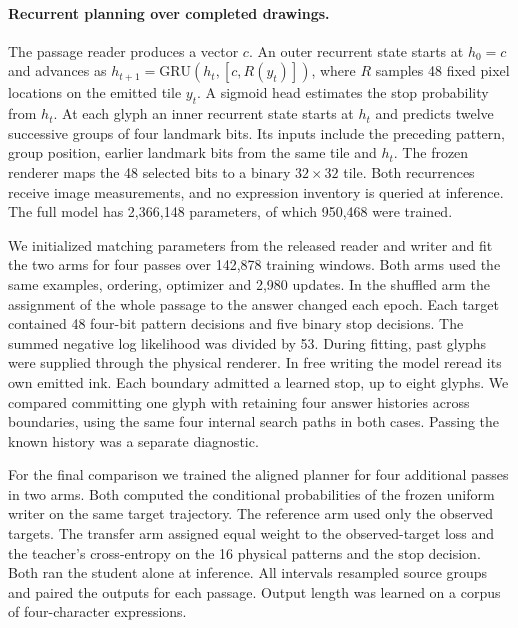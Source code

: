 \paragraph{Recurrent planning over completed drawings.}
The passage reader produces a vector $c$. An outer recurrent state starts at $h_0=c$ and advances as $h_{t+1}=\mathrm{GRU}(h_t,[c,R(y_t)])$, where $R$ samples 48 fixed pixel locations on the emitted tile $y_t$. A sigmoid head estimates the stop probability from $h_t$. At each glyph an inner recurrent state starts at $h_t$ and predicts twelve successive groups of four landmark bits. Its inputs include the preceding pattern, group position, earlier landmark bits from the same tile and $h_t$. The frozen renderer maps the 48 selected bits to a binary $32\times32$ tile. Both recurrences receive image measurements, and no expression inventory is queried at inference. The full model has 2,366,148 parameters, of which 950,468 were trained.

We initialized matching parameters from the released reader and writer and fit the two arms for four passes over 142,878 training windows. Both arms used the same examples, ordering, optimizer and 2,980 updates. In the shuffled arm the assignment of the whole passage to the answer changed each epoch. Each target contained 48 four-bit pattern decisions and five binary stop decisions. The summed negative log likelihood was divided by 53. During fitting, past glyphs were supplied through the physical renderer. In free writing the model reread its own emitted ink. Each boundary admitted a learned stop, up to eight glyphs. We compared committing one glyph with retaining four answer histories across boundaries, using the same four internal search paths in both cases. Passing the known history was a separate diagnostic.

For the final comparison we trained the aligned planner for four additional passes in two arms. Both computed the conditional probabilities of the frozen uniform writer on the same target trajectory. The reference arm used only the observed targets. The transfer arm assigned equal weight to the observed-target loss and the teacher's cross-entropy on the 16 physical patterns and the stop decision. Both ran the student alone at inference. All intervals resampled source groups and paired the outputs for each passage. Output length was learned on a corpus of four-character expressions.
